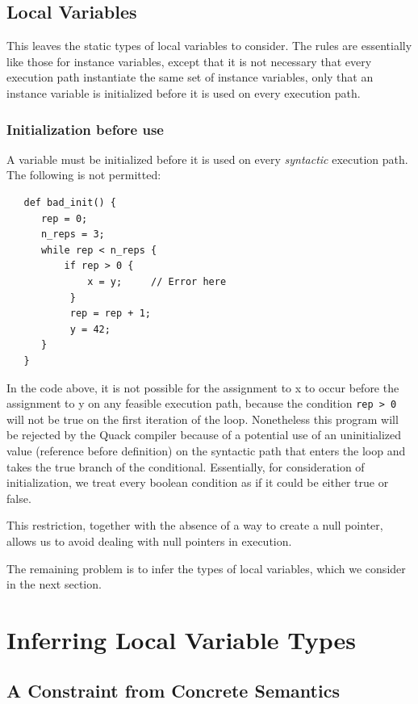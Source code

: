\documentclass[11pt]{article}
\begin{document}
\subsection{Local Variables} 


This leaves the static types of local variables to consider.  The
rules are essentially like those for instance variables, except that
it is not necessary that every execution path instantiate the same set
of instance variables, only that an instance variable is initialized
before it is used on every execution path. 

\subsubsection{Initialization before use}

A variable
must be initialized before it is used on every \emph{syntactic}
execution path.  The following is not permitted: 

\begin{verbatim}
   def bad_init() {
      rep = 0;
      n_reps = 3;
      while rep < n_reps {
          if rep > 0 {
              x = y;     // Error here
           }
           rep = rep + 1;
           y = 42;
      }
   }
\end{verbatim}

In the code above, it is not possible for the assignment to x to occur
before the assignment to y on any feasible execution path, because the
condition \verb|rep > 0| will not be true on the first iteration of
the loop.  Nonetheless this program will be rejected by the Quack
compiler because of a potential use of an uninitialized value
(reference before definition) on the syntactic path that enters the
loop and takes the true branch of the conditional.  Essentially, for
consideration of initialization, we treat every boolean condition as
if it could be either true or false. 

This restriction, together with the absence of a way to create a null
pointer, allows us to avoid dealing with null pointers in execution. 

The remaining problem is to infer the types of local variables, which
we consider in the next section. 

\section{Inferring Local Variable Types}

\subsection{A Constraint from Concrete Semantics}
\end{document}
